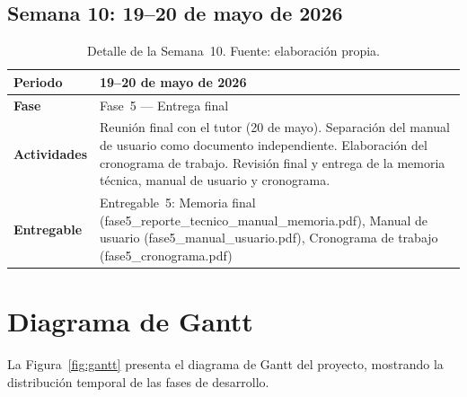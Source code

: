 \documentclass[11pt,a4paper,spanish]{book}
\begin{document}
\subsection{Semana 10: 19--20 de mayo de 2026}

\begin{table}[ht]
\centering
\begin{tabular}{p{3cm} p{10cm}}
\hline\hline
\textbf{Periodo} & 19--20 de mayo de 2026 \\ [0.5ex]
\hline
\textbf{Fase} & Fase~5 --- Entrega final \\ \hline
\textbf{Actividades} & Reuni\'{o}n final con el tutor (20 de mayo). Separaci\'{o}n del manual de usuario como documento independiente. Elaboraci\'{o}n del cronograma de trabajo. Revisi\'{o}n final y entrega de la memoria t\'{e}cnica, manual de usuario y cronograma. \\ \hline
\textbf{Entregable} & Entregable~5: Memoria final (fase5\_reporte\_tecnico\_manual\_memoria.pdf), Manual de usuario (fase5\_manual\_usuario.pdf), Cronograma de trabajo (fase5\_cronograma.pdf) \\ \hline
\end{tabular}
\caption[Semana 10]{Detalle de la Semana~10. Fuente: elaboraci\'{o}n propia.}
\label{tab:semana10}
\end{table}

\section{Diagrama de Gantt}

La Figura~\ref{fig:gantt} presenta el diagrama de Gantt del proyecto, mostrando la distribuci\'{o}n temporal de las fases de desarrollo.
\end{document}
